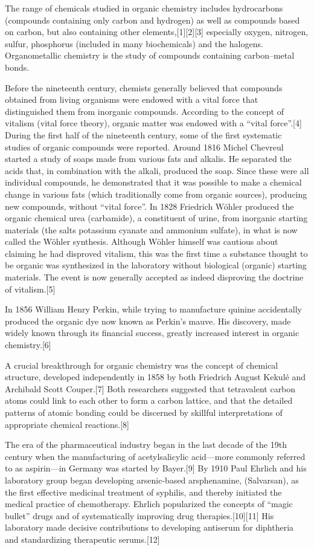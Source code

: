 \documentclass[
]{book}
\begin{document}
The range of chemicals studied in organic chemistry includes hydrocarbons (compounds containing only carbon and hydrogen) as well as compounds based on carbon, but also containing other elements,{[}1{]}{[}2{]}{[}3{]} especially oxygen, nitrogen, sulfur, phosphorus (included in many biochemicals) and the halogens. Organometallic chemistry is the study of compounds containing carbon--metal bonds.

Before the nineteenth century, chemists generally believed that compounds obtained from living organisms were endowed with a vital force that distinguished them from inorganic compounds. According to the concept of vitalism (vital force theory), organic matter was endowed with a ``vital force''.{[}4{]} During the first half of the nineteenth century, some of the first systematic studies of organic compounds were reported. Around 1816 Michel Chevreul started a study of soaps made from various fats and alkalis. He separated the acids that, in combination with the alkali, produced the soap. Since these were all individual compounds, he demonstrated that it was possible to make a chemical change in various fats (which traditionally come from organic sources), producing new compounds, without ``vital force''. In 1828 Friedrich Wöhler produced the organic chemical urea (carbamide), a constituent of urine, from inorganic starting materials (the salts potassium cyanate and ammonium sulfate), in what is now called the Wöhler synthesis. Although Wöhler himself was cautious about claiming he had disproved vitalism, this was the first time a substance thought to be organic was synthesized in the laboratory without biological (organic) starting materials. The event is now generally accepted as indeed disproving the doctrine of vitalism.{[}5{]}

In 1856 William Henry Perkin, while trying to manufacture quinine accidentally produced the organic dye now known as Perkin's mauve. His discovery, made widely known through its financial success, greatly increased interest in organic chemistry.{[}6{]}

A crucial breakthrough for organic chemistry was the concept of chemical structure, developed independently in 1858 by both Friedrich August Kekulé and Archibald Scott Couper.{[}7{]} Both researchers suggested that tetravalent carbon atoms could link to each other to form a carbon lattice, and that the detailed patterns of atomic bonding could be discerned by skillful interpretations of appropriate chemical reactions.{[}8{]}

The era of the pharmaceutical industry began in the last decade of the 19th century when the manufacturing of acetylsalicylic acid---more commonly referred to as aspirin---in Germany was started by Bayer.{[}9{]} By 1910 Paul Ehrlich and his laboratory group began developing arsenic-based arsphenamine, (Salvarsan), as the first effective medicinal treatment of syphilis, and thereby initiated the medical practice of chemotherapy. Ehrlich popularized the concepts of ``magic bullet'' drugs and of systematically improving drug therapies.{[}10{]}{[}11{]} His laboratory made decisive contributions to developing antiserum for diphtheria and standardizing therapeutic serums.{[}12{]}
\end{document}

